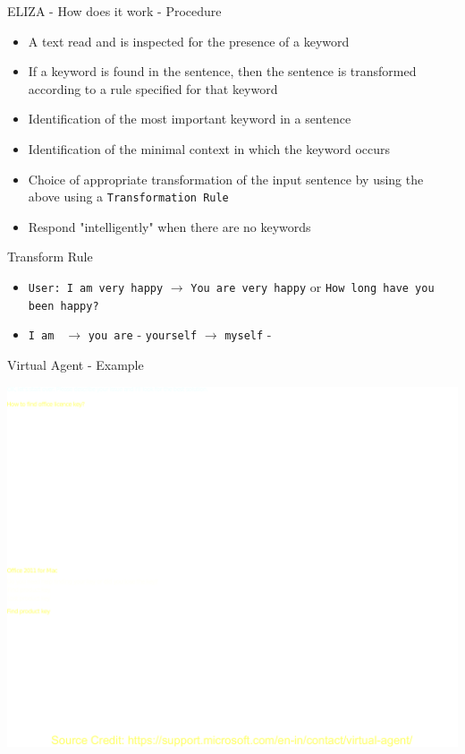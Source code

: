 \begin{frame}[fragile]{ELIZA - How does it work - Procedure}
\begin{itemize}
	\item A text read and is inspected for the presence of a keyword
	\item If a keyword is found in the sentence, then the sentence is transformed according to a rule specified for that keyword
    \item Identification of the most important keyword in a sentence
    \item Identification of the minimal context in which the keyword occurs
    \item Choice of appropriate transformation of the input sentence by using the above using a \verb|Transformation Rule|
    \item Respond "intelligently" when there are no keywords
\end{itemize}
\begin{block}{Transform Rule}

  \begin{itemize}
      \item   \verb|User: I am very happy| $\rightarrow$ \verb|You are very happy| or \verb|How long have you been happy?|
      \item \verb|I am | $\rightarrow$ \verb|you are| - \verb|yourself| $\rightarrow$ \verb|myself| -
  \end{itemize}

\end{block}

\end{frame}

\begin{frame}{Virtual Agent - Example}
\begin{center}
	\includegraphics[width=0.7\linewidth]{"./Images/Virtual Agent - Microsoft SupportV2"}
\end{center}
\end{frame}

